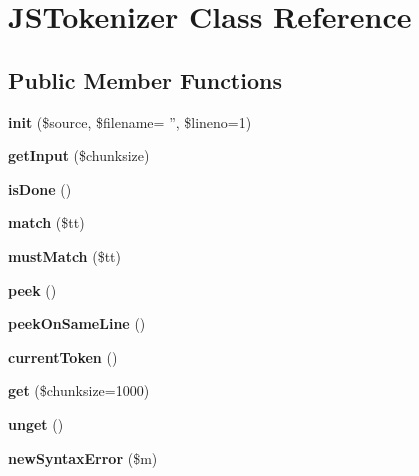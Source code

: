 \hypertarget{class_j_s_tokenizer}{
\section{JSTokenizer Class Reference}
\label{class_j_s_tokenizer}
}
\subsection*{Public Member Functions}
\begin{DoxyCompactItemize}
\item 
\hypertarget{class_j_s_tokenizer_a6abe176871b17b8b2fd742e8368cd0c1}{
{\bfseries init} (\$source, \$filename= '', \$lineno=1)}
\label{class_j_s_tokenizer_a6abe176871b17b8b2fd742e8368cd0c1}

\item 
\hypertarget{class_j_s_tokenizer_ae2e30d51dc8c95b9946dcff50964943d}{
{\bfseries getInput} (\$chunksize)}
\label{class_j_s_tokenizer_ae2e30d51dc8c95b9946dcff50964943d}

\item 
\hypertarget{class_j_s_tokenizer_aba418a56e45f60994fda709b66918ca1}{
{\bfseries isDone} ()}
\label{class_j_s_tokenizer_aba418a56e45f60994fda709b66918ca1}

\item 
\hypertarget{class_j_s_tokenizer_ad21d39112283223d90a709e5ce48b884}{
{\bfseries match} (\$tt)}
\label{class_j_s_tokenizer_ad21d39112283223d90a709e5ce48b884}

\item 
\hypertarget{class_j_s_tokenizer_a7f801f2e9d0f0baab74f6ac270b53d9a}{
{\bfseries mustMatch} (\$tt)}
\label{class_j_s_tokenizer_a7f801f2e9d0f0baab74f6ac270b53d9a}

\item 
\hypertarget{class_j_s_tokenizer_af0d2b98b49496eaef856a5b277fa775b}{
{\bfseries peek} ()}
\label{class_j_s_tokenizer_af0d2b98b49496eaef856a5b277fa775b}

\item 
\hypertarget{class_j_s_tokenizer_a46610794fdbcee1d0036b19cb558c59b}{
{\bfseries peekOnSameLine} ()}
\label{class_j_s_tokenizer_a46610794fdbcee1d0036b19cb558c59b}

\item 
\hypertarget{class_j_s_tokenizer_a42630dd036d9a5bdf0245eeb77e732c5}{
{\bfseries currentToken} ()}
\label{class_j_s_tokenizer_a42630dd036d9a5bdf0245eeb77e732c5}

\item 
\hypertarget{class_j_s_tokenizer_a1b2405121c0b98d4615a216ecb5aaa2e}{
{\bfseries get} (\$chunksize=1000)}
\label{class_j_s_tokenizer_a1b2405121c0b98d4615a216ecb5aaa2e}

\item 
\hypertarget{class_j_s_tokenizer_ae1b7cb176871b29d116d0ff38cbb89da}{
{\bfseries unget} ()}
\label{class_j_s_tokenizer_ae1b7cb176871b29d116d0ff38cbb89da}

\item 
\hypertarget{class_j_s_tokenizer_a4c7c56edc327293c1f63edc0904ada93}{
{\bfseries newSyntaxError} (\$m)}
\label{class_j_s_tokenizer_a4c7c56edc327293c1f63edc0904ada93}

\end{DoxyCompactItemize}
